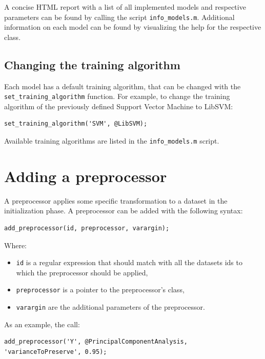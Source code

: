 A concise HTML report with a list of all implemented models and respective parameters can be found by calling the script \verb|info_models.m|. Additional information on each model can be found by visualizing the help for the respective class.

\subsection{Changing the training algorithm}

Each model has a default training algorithm, that can be changed with the \verb|set_training_algorithm| function. For example, to change the training algorithm of the previously defined Support Vector Machine to LibSVM:

\begin{lstlisting}
set_training_algorithm('SVM', @LibSVM); 
\end{lstlisting}

\noindent Available training algorithms are listed in the \verb|info_models.m| script.

\section{Adding a preprocessor}

A preprocessor applies some specific transformation to a dataset in the initialization phase. A preprocessor can be added with the following syntax:

\begin{lstlisting}
add_preprocessor(id, preprocessor, varargin);
\end{lstlisting}

\noindent Where:

\begin{itemize}
\item \verb|id| is a regular expression that should match with all the datasets ids to which the preprocessor should be applied,
\item \verb|preprocessor| is a pointer to the preprocessor's class,
\item \verb|varargin| are the additional parameters of the preprocessor.
\end{itemize}

\noindent As an example, the call:

\begin{lstlisting}
add_preprocessor('Y', @PrincipalComponentAnalysis, 'varianceToPreserve', 0.95);
\end{lstlisting}

